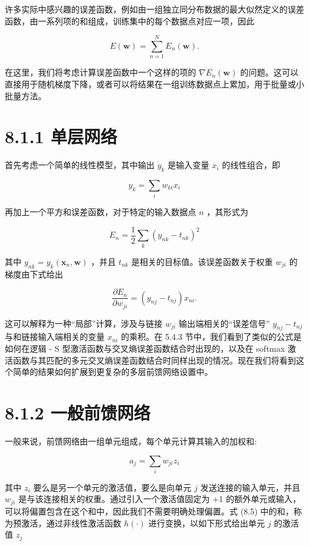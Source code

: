 \documentclass[10pt]{article}
\begin{document}
许多实际中感兴趣的误差函数，例如由一组独立同分布数据的最大似然定义的误差函数，由一系列项的和组成，训练集中的每个数据点对应一项，因此

\[
E\left( \mathbf{w}\right)  = \mathop{\sum }\limits_{{n = 1}}^{N}{E}_{n}\left( \mathbf{w}\right) . \tag{8.1}
\]

在这里，我们将考虑计算误差函数中一个这样的项的 \(\nabla {E}_{n}\left( \mathbf{w}\right)\) 的问题。这可以直接用于随机梯度下降，或者可以将结果在一组训练数据点上累加，用于批量或小批量方法。

\section*{8.1.1 单层网络}

首先考虑一个简单的线性模型，其中输出 \({y}_{k}\) 是输入变量 \({x}_{i}\) 的线性组合，即

\[
{y}_{k} = \mathop{\sum }\limits_{i}{w}_{ki}{x}_{i} \tag{8.2}
\]

再加上一个平方和误差函数，对于特定的输入数据点 \(n\) ，其形式为

\[
{E}_{n} = \frac{1}{2}\mathop{\sum }\limits_{k}{\left( {y}_{nk} - {t}_{nk}\right) }^{2} \tag{8.3}
\]

其中 \({y}_{nk} = {y}_{k}\left( {{\mathbf{x}}_{n},\mathbf{w}}\right)\) ，并且 \({t}_{nk}\) 是相关的目标值。该误差函数关于权重 \({w}_{ji}\) 的梯度由下式给出

\[
\frac{\partial {E}_{n}}{\partial {w}_{ji}} = \left( {{y}_{nj} - {t}_{nj}}\right) {x}_{ni}. \tag{8.4}
\]

这可以解释为一种“局部”计算，涉及与链接 \({w}_{ji}\) 输出端相关的“误差信号” \({y}_{nj} - {t}_{nj}\) 与和链接输入端相关的变量 \({x}_{ni}\) 的乘积。在 5.4.3 节中，我们看到了类似的公式是如何在逻辑 - S 型激活函数与交叉熵误差函数结合时出现的，以及在 softmax 激活函数与其匹配的多元交叉熵误差函数结合时同样出现的情况。现在我们将看到这个简单的结果如何扩展到更复杂的多层前馈网络设置中。

\section*{8.1.2 一般前馈网络}

一般来说，前馈网络由一组单元组成，每个单元计算其输入的加权和:

\[
{a}_{j} = \mathop{\sum }\limits_{i}{w}_{ji}{z}_{i} \tag{8.5}
\]

其中 \({z}_{i}\) 要么是另一个单元的激活值，要么是向单元 \(j\) 发送连接的输入单元，并且 \({w}_{ji}\) 是与该连接相关的权重。通过引入一个激活值固定为 +1 的额外单元或输入，可以将偏置包含在这个和中，因此我们不需要明确处理偏置。式 (8.5) 中的和，称为预激活，通过非线性激活函数 \(h\left( \cdot \right)\) 进行变换，以如下形式给出单元 \(j\) 的激活值 \({z}_{j}\)
\end{document}
